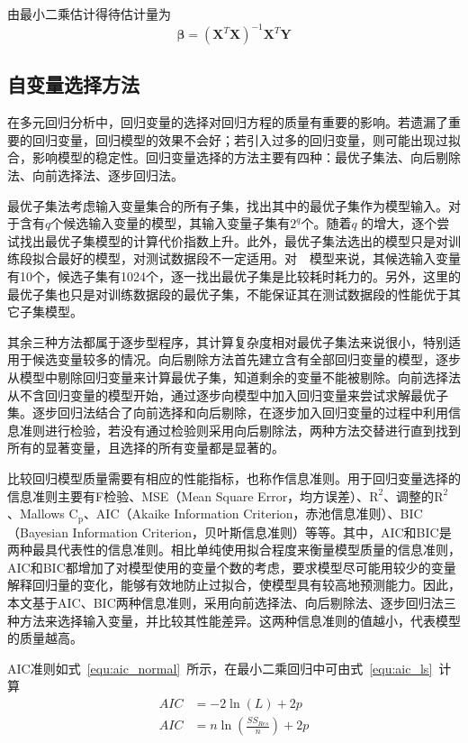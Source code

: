 由最小二乘估计得待估计量为
\begin{equation}
{\bm{\beta}}=(\bm{X}^{T}\bm{X})^{-1}\bm{X}^{T}\bm{Y}
\end{equation}

\subsection{自变量选择方法}

在多元回归分析中，回归变量的选择对回归方程的质量有重要的影响。若遗漏了重要的回归变量，回归模型的效果不会好；若引入过多的回归变量，则可能出现过拟合，影响模型的稳定性。回归变量选择的方法主要有四种：最优子集法、向后剔除法、向前选择法、逐步回归法。

最优子集法考虑输入变量集合的所有子集，找出其中的最优子集作为模型输入。对于含有$q$个候选输入变量的模型，其输入变量子集有$2^{q}$个。随着$q$ 的增大，逐个尝试找出最优子集模型的计算代价指数上升。此外，最优子集法选出的模型只是对训练段拟合最好的模型，对测试数据段不一定适用。对~~模型来说，其候选输入变量有10个，候选子集有1024个，逐一找出最优子集是比较耗时耗力的。另外，这里的最优子集也只是对训练数据段的最优子集，不能保证其在测试数据段的性能优于其它子集模型。

其余三种方法都属于逐步型程序，其计算复杂度相对最优子集法来说很小，特别适用于候选变量较多的情况。向后剔除方法首先建立含有全部回归变量的模型，逐步从模型中剔除回归变量来计算最优子集，知道剩余的变量不能被剔除。向前选择法从不含回归变量的模型开始，通过逐步向模型中加入回归变量来尝试求解最优子集。逐步回归法结合了向前选择和向后剔除，在逐步加入回归变量的过程中利用信息准则进行检验，若没有通过检验则采用向后剔除法，两种方法交替进行直到找到所有的显著变量，且选择的所有变量都是显著的\cite{montgomery2015introduction}。

比较回归模型质量需要有相应的性能指标，也称作信息准则。用于回归变量选择的信息准则主要有F检验、MSE（Mean Square Error，均方误差）、$\textrm{R}^{\textrm{2}}$、调整的$\textrm{R}^{\textrm{2}}$、Mallows $\textrm{C}_{\textrm{p}}$、AIC（Akaike Information Criterion，赤池信息准则）、BIC（Bayesian Information Criterion，贝叶斯信息准则）等等。其中，AIC和BIC是两种最具代表性的信息准则\cite{yong2005can}。相比单纯使用拟合程度来衡量模型质量的信息准则，AIC和BIC都增加了对模型使用的变量个数的考虑，要求模型尽可能用较少的变量解释回归量的变化，能够有效地防止过拟合，使模型具有较高地预测能力。因此，本文基于AIC、BIC两种信息准则，采用向前选择法、向后剔除法、逐步回归法三种方法来选择输入变量，并比较其性能差异。这两种信息准则的值越小，代表模型的质量越高。

AIC准则如式~\ref{equ:aic_normal}~所示，在最小二乘回归中可由式~\ref{equ:aic_ls}~计算
\begin{align}
AIC &= -2\ln (L) + 2p \label{equ:aic_normal}\\
AIC &= n\ln(\frac{SS_{Res}}{n})+2p \label{equ:aic_ls}
\end{align}

